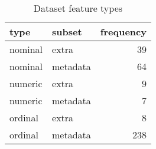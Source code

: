 \begin{table}[H]
\centering
\caption{Dataset feature types}
\label{tab:dataset-feature-types}
\begin{tabular}{llr}
\toprule
type & subset & frequency \\
\midrule
nominal & extra & 39 \\
nominal & metadata & 64 \\
numeric & extra & 9 \\
numeric & metadata & 7 \\
ordinal & extra & 8 \\
ordinal & metadata & 238 \\
\bottomrule
\end{tabular}
\end{table}
